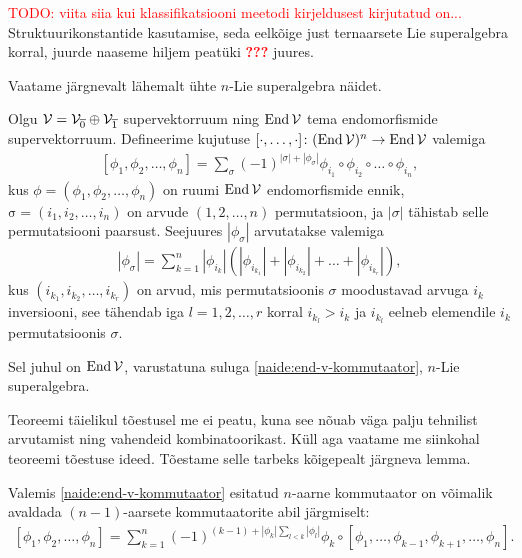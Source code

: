\textcolor{red}{
    TODO: viita siia kui klassifikatsiooni meetodi kirjeldusest
    kirjutatud on...
}
Struktuurikonstantide kasutamise, seda eelkõige just ternaarsete
Lie superalgebra korral, juurde naaseme hiljem peatüki
\textcolor{red}{\textbf{???}} juures.

Vaatame järgnevalt lähemalt ühte $n$-Lie superalgebra näidet.
\cite{Abramov:2014}

\begin{thm}\label{teoreem:endomorphism-lie-algebra}
    Olgu $\mathcal{V} = \mathcal{V}_{\overline{0}} \oplus \mathcal{V}_{\overline{1}}$
    supervektorruum ning $\operatorname{End} \mathcal{V}$ tema endomorfismide
    supervektorruum. Defineerime kujutuse
    $[\cdot, \dots, \cdot] \colon (\operatorname{End} \mathcal{V})^n \to \operatorname{End} \mathcal{V}$ valemiga
    \begin{align}\label{naide:end-v-kommutaator}
        [\phi_1, \phi_2, \dots, \phi_n] =
        \sum_\sigma (-1)^{|\sigma|+|\phi_\sigma|}
            \phi_{i_1} \circ \phi_{i_2} \circ \ldots \circ \phi_{i_n},
    \end{align}
    kus $\phi = (\phi_1, \phi_2, \dots, \phi_n)$ on ruumi
    $\operatorname{End} \mathcal{V}$ endomorfismide ennik,
    $\mathrm{\sigma} = (i_1, i_2, \dots, i_n)$ on arvude
    $(1, 2, \dots, n)$ permutatsioon, ja $|\sigma|$
    tähistab selle permutatsiooni paarsust. Seejuures
    $|\phi_\sigma|$ arvutatakse valemiga
    \begin{align}\label{eq:permutation-parity}
        |\phi_\sigma| = \sum_{k=1}^{n} |\phi_{i_k}|
            \left(
                |\phi_{i_{k_1}}| + |\phi_{i_{k_2}}| + \dots +
                |\phi_{i_{k_r}}|
            \right),
    \end{align}
    kus $(i_{k_1}, i_{k_2}, \dots, i_{k_r})$ on arvud, mis
    permutatsioonis $\sigma$ moodustavad arvuga $i_k$ inversiooni,
    see tähendab iga $l = 1, 2, \dots, r$ korral $i_{k_l} > i_k$ ja
    $i_{k_l}$ eelneb elemendile $i_k$ permutatsioonis $\sigma$.

    Sel juhul on $\operatorname{End} \mathcal{V}$, varustatuna suluga
    \eqref{naide:end-v-kommutaator}, $n$-Lie superalgebra.
\end{thm}

Teoreemi täielikul tõestusel me ei peatu, kuna see nõuab väga palju
tehnilist arvutamist ning vahendeid kombinatoorikast. Küll aga vaatame
me siinkohal teoreemi tõestuse ideed. Tõestame selle tarbeks kõigepealt
järgneva lemma.

\begin{lemma}\label{lemma:n-sulg to (n-1)-sulg}
    Valemis \eqref{naide:end-v-kommutaator} esitatud $n$-aarne
    kommutaator on võimalik avaldada $(n-1)$-aarsete
    kommutaatorite abil järgmiselt:
    \begin{align}\label{eq:n komm by n-1 komm}
        [\phi_1, \phi_2, \dots, \phi_n] =
        \sum_{k=1}^{n} (-1)^{
            (k-1) + |\phi_k| \sum_{l < k} |\phi_l|
        } \phi_k \circ [
            \phi_1, \dots, \phi_{k-1}, \phi_{k+1}, \dots, \phi_n
        ].
    \end{align}
\end{lemma}

